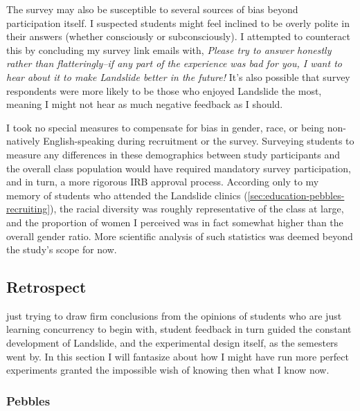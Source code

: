 The survey may also be susceptible to several sources of bias beyond participation itself.
I suspected students might feel inclined to be overly polite in their answers
(whether consciously or subconsciously).
I attempted to counteract this by concluding my survey link emails with,
{\em Please try to answer honestly rather than flatteringly--if any part
of the experience was bad for you, I want to hear about it to make
Landslide better in the future!}
It's also possible that survey respondents %
were more likely to be those who enjoyed Landslide the most,
meaning I might not hear as much negative feedback as I should.

I took no special measures to compensate for bias in gender, race, or being non-natively English-speaking
during recruitment or the survey.
Surveying students to measure any differences in these demographics between study participants and the overall class population
would have required mandatory survey participation,
and in turn, a more rigorous IRB approval process.
According only to my memory of students who attended the Landslide clinics
(\cref{sec:education-pebbles-recruiting}),
the racial diversity was roughly representative of the class at large,
and the proportion of women I perceived was in fact somewhat higher than the overall gender ratio.
More scientific analysis of such statistics was deemed beyond the study's scope for now.

\subsection{Retrospect}

 just trying to draw firm conclusions from
the opinions of students who are just learning concurrency to begin with,
student feedback in turn guided the constant development
of Landslide, and the experimental design itself,
as the semesters went by.
In this section I will fantasize about how I might have run more perfect experiments
granted the impossible wish of knowing then what I know now.

\subsubsection{Pebbles}

